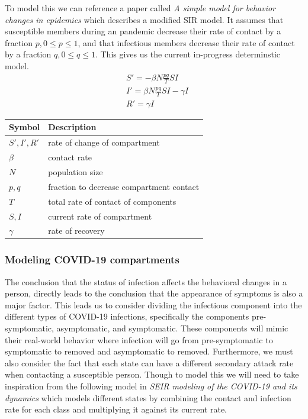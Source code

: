 \documentclass{article}
\begin{document}
To model this we can reference a paper called \textit{A simple model for behavior changes in epidemics} which describes a modified SIR model. It assumes that susceptible members during an pandemic decrease their rate of contact by a fraction $p, 0 \le p \le 1$, and that infectious members decrease their rate of contact by a fraction $q, 0 \le q \le 1$. This gives us the current in-progress determinstic model.
\begin{align*}
  & S' = -\beta N \frac{pq}{T}SI           \\
  & I' = \beta N \frac{pq}{T}SI - \gamma I \\
  & R' = \gamma I
\end{align*}

\begin{center}
  \begin{tabular}{|l|l|}
    \hline
    Symbol       & Description                              \\ [0.5ex]
    \hline\hline
    $S', I', R'$ & rate of change of compartment            \\
    \hline
    $\beta$      & contact rate                             \\
    \hline
    $N$          & population size                          \\
    \hline
    $p,q$        & fraction to decrease compartment contact \\
    \hline
    $T$          & total rate of contact of components      \\
    \hline
    $S, I$       & current rate of compartment              \\
    \hline
    $\gamma$     & rate of recovery                         \\
    \hline
  \end{tabular}
\end{center}
\cite{behavior}


\subsubsection{Modeling COVID-19 compartments}
The conclusion that the status of infection affects the behavioral changes in a person, directly leads to the conclusion that the appearance of symptoms is also a major factor. This leads us to consider dividing the infectious component into the different types of COVID-19 infections, specifically the components pre-symptomatic, asymptomatic, and symptomatic. These components will mimic their real-world behavior where infection will go from pre-symptomatic to symptomatic to removed and asymptomatic to removed. Furthermore, we must also consider the fact that each state can have a different secondary attack rate when contacting a susceptible person. \cite{review} Though to model this we will need to take inspiration from the following model in \textit{SEIR modeling of the COVID-19 and its dynamics} which models different states by combining the contact and infection rate for each class and multiplying it against its current rate.
\end{document}
